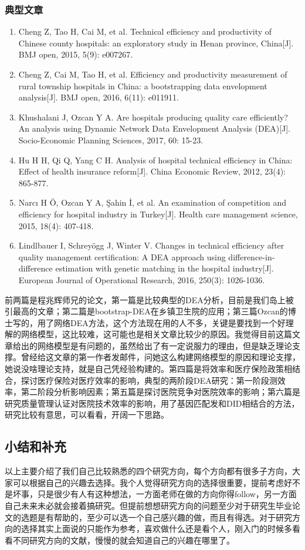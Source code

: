 \documentclass[11pt, a4paper]{article}
\begin{document}
\subsubsection{典型文章}
\begin{enumerate}[(1)]
	\item Cheng Z, Tao H, Cai M, et al. Technical efficiency and productivity of Chinese county hospitals: an exploratory study in Henan province, China[J]. BMJ open, 2015, 5(9): e007267.
	\item Cheng Z, Cai M, Tao H, et al. Efficiency and productivity measurement of rural township hospitals in China: a bootstrapping data envelopment analysis[J]. BMJ open, 2016, 6(11): e011911.
	\item Khushalani J, Ozcan Y A. Are hospitals producing quality care efficiently? An analysis using Dynamic Network Data Envelopment Analysis (DEA)[J]. Socio-Economic Planning Sciences, 2017, 60: 15-23.
	\item Hu H H, Qi Q, Yang C H. Analysis of hospital technical efficiency in China: Effect of health insurance reform[J]. China Economic Review, 2012, 23(4): 865-877.
	\item Narcı H Ö, Ozcan Y A, Şahin İ, et al. An examination of competition and efficiency for hospital industry in Turkey[J]. Health care management science, 2015, 18(4): 407-418.
	\item Lindlbauer I, Schreyögg J, Winter V. Changes in technical efficiency after quality management certification: A DEA approach using difference-in-difference estimation with genetic matching in the hospital industry[J]. European Journal of Operational Research, 2016, 250(3): 1026-1036.
\end{enumerate}
前两篇是程兆辉师兄的论文，第一篇是比较典型的DEA分析，目前是我们岛上被引最高的文章；第二篇是bootstrap-DEA在乡镇卫生院的应用；第三篇Ozcan的博士写的，用了网络DEA方法，这个方法现在用的人不多，关键是要找到一个好理解的网络模型，这比较难，这可能也是相关文章比较少的原因。我觉得目前这篇文章给出的网络模型是有问题的，虽然给出了有一定说服力的理由，但是缺乏理论支撑。曾经给这文章的第一作者发邮件，问她这么构建网络模型的原因和理论支撑，她说没啥理论支持，就是自己凭经验构建的。第四篇是将效率和医疗保险政策相结合，探讨医疗保险对医疗效率的影响，典型的两阶段DEA研究：第一阶段测效率，第二阶段分析影响因素；第五篇是探讨医院竞争对医院效率的影响；第六篇是研究质量管理认证对医院技术效率的影响，用了基因匹配发和DID相结合的方法，研究比较有意思，可以看看，开阔一下思路。


\subsection{小结和补充}
以上主要介绍了我们自己比较熟悉的四个研究方向，每个方向都有很多子方向，大家可以根据自己的兴趣去选择。我个人觉得研究方向的选择很重要，提前考虑好不是坏事，只是很少有人有这种想法，一方面老师在做的方向你得follow，另一方面自己未来未必就会接着搞研究。但提前想想研究方向的问题至少对于研究生毕业论文的选题是有帮助的，至少可以选一个自己感兴趣的做，而且有得选。对于研究方向的选择其实上面说的只能作为参考，喜欢做什么还是看个人，刚入门的时候多看看不同研究方向的文献，慢慢的就会知道自己的兴趣在哪里了。
\end{document}
